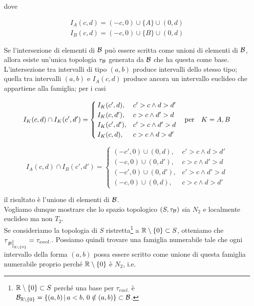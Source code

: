 dove

\begin{gather}
	I_{A}(c,d) = (-c,0) \cup \{A\} \cup (0,d) \\
	I_{B}(c,d) = (-c,0) \cup \{B\} \cup (0,d)
\end{gather}

Se l'intersezione di elementi di $ \mathcal{B} $ può essere scritta come unioni di elementi di $ \mathcal{B} $, allora esiste un'unica topologia $ \tau_{\mathcal{B}} $ generata da $ \mathcal{B} $ che ha questa come base. \\
L'intersezione tra intervalli di tipo $ (a,b) $ produce intervalli dello stesso tipo; quella tra intervalli $ (a,b) $ e $ I_{A}(c,d) $ produce ancora un intervallo euclideo che appartiene alla famiglia; per i casi

\begin{equation}
	I_{K}(c,d) \cap I_{K}(c',d') = %
		\begin{cases}
			I_{K}(c',d), & c' > c \wedge d > d' \\
			I_{K}(c,d'), & c > c \wedge d' > d \\
			I_{K}(c',d'), & c' > c \wedge d' > d \\
			I_{K}(c,d), & c > c \wedge d > d'
		\end{cases} %
	\qq{per} K = A, B
\end{equation}

\begin{equation}
	I_{A}(c,d) \cap I_{B}(c',d') = %
	\begin{cases}
		(- c',0) \cup (0,d), & c' > c \wedge d > d' \\
		(- c,0) \cup (0,d'), & c > c \wedge d' > d \\
		(- c',0) \cup (0,d'), & c' > c \wedge d' > d \\
		(- c,0) \cup (0,d), & c > c \wedge d > d'
	\end{cases}
\end{equation}

il risultato è l'unione di elementi di $ \mathcal{B} $. \\
Vogliamo dunque mostrare che lo spazio topologico $ (S,\tau_{\mathcal{B}}) $ sia $ N_{2} $ e localmente euclideo ma non $ T_{2} $. \\
Se consideriamo la topologia di $ S $ ristretta\footnote{%
	$ \mathbb{R} \setminus \{0\} \subset S $ perché una base per $ \tau_{eucl.} $ è $ \mathcal{B}_{\mathbb{R} \setminus \{0\}} = \left\{ (a,b) \, \middle| \, a<b, \, 0 \notin (a,b) \right\} \subset \mathcal{B} $.%
} a $ \mathbb{R} \setminus \{0\} \subset S $, otteniamo che $ \tau_{\eval{\B}_{\R \setminus \{0\}}} = \tau_{eucl.} $. Possiamo quindi trovare una famiglia numerabile tale che ogni intervallo della forma $ (a,b) $ possa essere scritto come unione di questa famiglia numerabile proprio perché $ \mathbb{R} \setminus \{0\} $ è $ N_{2} $, i.e.

